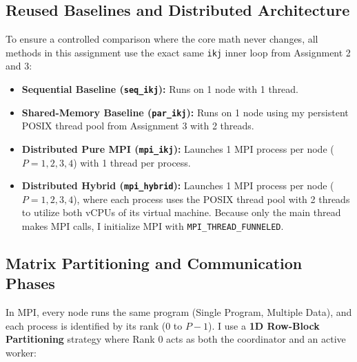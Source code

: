\documentclass[11pt,a4paper]{article}
\begin{document}
\subsection{Reused Baselines and Distributed Architecture}
To ensure a controlled comparison where the core math never changes, all methods in this assignment use the exact same \texttt{ikj} inner loop from Assignment 2 and 3:
\begin{itemize}
    \item \textbf{Sequential Baseline (\texttt{seq\_ikj}):} Runs on 1 node with 1 thread.
    \item \textbf{Shared-Memory Baseline (\texttt{par\_ikj}):} Runs on 1 node using my persistent POSIX thread pool from Assignment 3 with 2 threads.
    \item \textbf{Distributed Pure MPI (\texttt{mpi\_ikj}):} Launches 1 MPI process per node ($P = 1, 2, 3, 4$) with 1 thread per process.
    \item \textbf{Distributed Hybrid (\texttt{mpi\_hybrid}):} Launches 1 MPI process per node ($P = 1, 2, 3, 4$), where each process uses the POSIX thread pool with 2 threads to utilize both vCPUs of its virtual machine. Because only the main thread makes MPI calls, I initialize MPI with \texttt{MPI\_THREAD\_FUNNELED}.
\end{itemize}

\subsection{Matrix Partitioning and Communication Phases}
In MPI, every node runs the same program (Single Program, Multiple Data), and each process is identified by its rank ($0$ to $P-1$). I use a \textbf{1D Row-Block Partitioning} strategy where Rank 0 acts as both the coordinator and an active worker:
\end{document}
